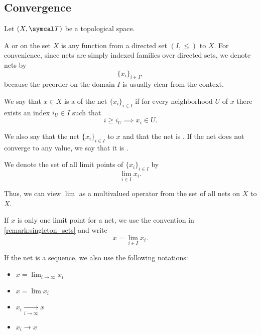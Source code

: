 \subsection{Convergence}\label{subsec:convergence}

Let \( (X, \Cal{T}) \) be a topological space.

\begin{definition}\label{def:topological_net}\cite[49]{Engelking1989}
  A  or  on the set \( X \) is any function from a directed set \( (I, \leq) \) to \( X \). For convenience, since nets are simply indexed families over directed sets, we denote nets by
  \begin{equation*}
    \{ x_i \}_{i \in I},
  \end{equation*}
  because the preorder on the domain \( I \) is usually clear from the context.
\end{definition}

\begin{definition}\label{def:net_limit_point}\cite[49]{Engelking1989}
  We say that \( x \in X \) is a  of the net \( \{ x_i \}_{i \in I} \) if for every neighborhood \( U \) of \( x \) there exists an index \( i_U \in I \) such that
  \begin{equation*}
    i \geq i_U \implies x_i \in U.
  \end{equation*}

  We also say that the net \( \{ x_i \}_{i \in I} \)  to \( x \) and that the net is . If the net does not converge to any value, we say that it is .

  We denote the set of all limit points of \( \{ x_i \}_{i \in I} \) by
  \begin{equation*}
    \lim_{i \in I} x_i.
  \end{equation*}

  Thus, we can view \( \lim \) as a multivalued operator from the set of all nets on \( X \) to \( X \).

  If \( x \) is only one limit point for a net, we use the convention in \cref{remark:singleton_sets} and write
  \begin{equation*}
    x = \lim_{i \in I} x_i.
  \end{equation*}

  If the net is a sequence, we also use the following notations:
  \begin{itemize}
    \item \( x = \lim_{i \to \infty} x_i \)
    \item \( x = \lim x_i \)
    \item \( x_i \xrightarrow[i \to \infty]{} x \)
    \item \( x_i \to x \)
  \end{itemize}
\end{definition}

